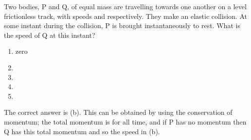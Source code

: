 
\begin{problem}[A1988PIQ4l]
{Two bodies, P and Q, of equal mass are travelling towards one another on a level frictionless track, with speeds  and  respectively. They make an elastic collision. At some instant during the collision, P is brought instantaneously to rest. What is the speed of Q at this instant?
\begin{enumerate}
	\item zero
	\item {} \answer
	\item {}
	\item {}
	\item {}
\end{enumerate}
}
{}
{The correct answer is (b). This can be obtained by using the conservation of momentum; the total momentum is  for all time, and if P has no momentum then Q has this total momentum and so the speed in (b).}
\end{problem}